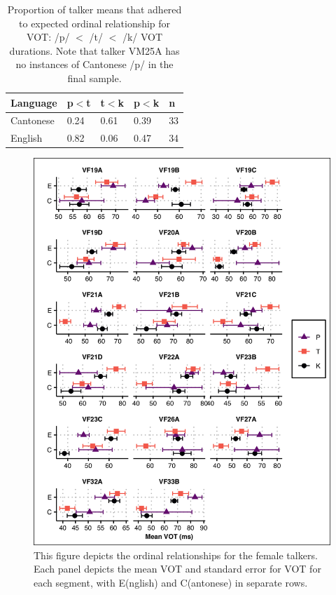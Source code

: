 \begin{table}[hb!]
\caption{Proportion of talker means that adhered to expected ordinal relationship for VOT: /p/ $<$ /t/ $<$ /k/ VOT durations. Note that talker VM25A has no instances of Cantonese /p/ in the final sample.}
  \label{tab:ordrel}
  \centering
  \begin{tabular}{lllll}
    \toprule
    \textbf{Language} & \textbf{p$<$t} & \textbf{t$<$k} & \textbf{p$<$k} & \textbf{n} \\
    \midrule
    Cantonese	& 0.24	& 0.61	& 0.39	& 33 \\
    English	    & 0.82	& 0.06	& 0.47	& 34 \\
    \bottomrule
  \end{tabular}
\end{table}

\begin{figure}[htbp]
  \begin{center}
  \includegraphics[width=0.9\linewidth]{figures/ch4_ordrel_vf_5in.png} 
  \caption{This figure depicts the ordinal relationships for the female talkers. Each panel depicts the mean VOT and standard error for VOT for each segment, with E(nglish) and C(antonese) in separate rows.}
  \label{ch4:fig:ordrelvf}
  \end{center}
\end{figure}

